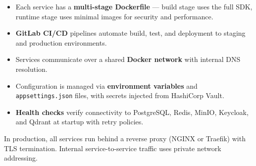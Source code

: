 \begin{itemize}[leftmargin=18pt]
  \item Each service has a \textbf{multi-stage Dockerfile} ---
        build stage uses the full SDK, runtime stage uses
        minimal images for security and performance.
  \item \textbf{GitLab CI/CD} pipelines automate build, test,
        and deployment to staging and production environments.
  \item Services communicate over a shared \textbf{Docker
        network} with internal DNS resolution.
  \item Configuration is managed via \textbf{environment
        variables} and \texttt{appsettings.json} files, with
        secrets injected from HashiCorp Vault.
  \item \textbf{Health checks} verify connectivity to
        PostgreSQL, Redis, MinIO, Keycloak, and Qdrant at
        startup with retry policies.
\end{itemize}

\begin{ugTip}
  In production, all services run behind a reverse proxy
  (NGINX or Traefik) with TLS termination. Internal
  service-to-service traffic uses private network addressing.
\end{ugTip}

\newpage

